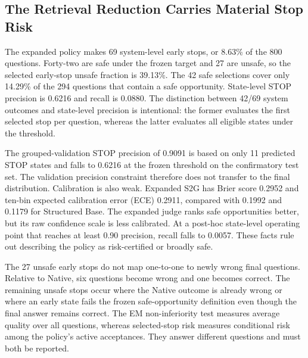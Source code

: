 \documentclass[11pt,a4paper]{article}
\begin{document}
\begin{table}[H]
\centering
\small
\caption{Judge diagnostics on the confirmatory test set. STOP P/R/AP are state-level metrics over all eligible states; early-stop counts evaluate the first threshold crossing per question.}
\label{tab:suffix800-diagnostics}
\end{table}

\subsection{The Retrieval Reduction Carries Material Stop Risk}

The expanded policy makes 69 system-level early stops, or 8.63\% of the 800 questions. Forty-two are safe under the frozen target and 27 are unsafe, so the selected early-stop unsafe fraction is 39.13\%. The 42 safe selections cover only 14.29\% of the 294 questions that contain a safe opportunity. State-level STOP precision is 0.6216 and recall is 0.0880. The distinction between 42/69 system outcomes and state-level precision is intentional: the former evaluates the first selected stop per question, whereas the latter evaluates all eligible states under the threshold.

The grouped-validation STOP precision of 0.9091 is based on only 11 predicted STOP states and falls to 0.6216 at the frozen threshold on the confirmatory test set. The validation precision constraint therefore does not transfer to the final distribution. Calibration is also weak. Expanded S2G has Brier score 0.2952 and ten-bin expected calibration error (ECE) 0.2911, compared with 0.1992 and 0.1179 for Structured Base. The expanded judge ranks safe opportunities better, but its raw confidence scale is less calibrated. At a post-hoc state-level operating point that reaches at least 0.90 precision, recall falls to 0.0057. These facts rule out describing the policy as risk-certified or broadly safe.

The 27 unsafe early stops do not map one-to-one to newly wrong final questions. Relative to Native, six questions become wrong and one becomes correct. The remaining unsafe stops occur where the Native outcome is already wrong or where an early state fails the frozen safe-opportunity definition even though the final answer remains correct. The EM non-inferiority test measures average quality over all questions, whereas selected-stop risk measures conditional risk among the policy's active acceptances. They answer different questions and must both be reported.
\end{document}
